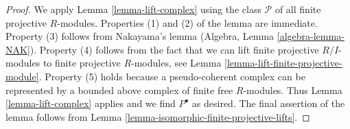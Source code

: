 \documentclass[10pt,a4paper]{amsart}
\theoremstyle{plain}
\theoremstyle{definition}
\theoremstyle{remark}
\numberwithin{equation}{subsection}
\begin{document}
\begin{proof}
We apply Lemma \ref{lemma-lift-complex} using the class $\mathcal{P}$
of all finite projective $R$-modules. Properties (1) and (2)
of the lemma are immediate.
Property (3) follows from Nakayama's lemma
(Algebra, Lemma \ref{algebra-lemma-NAK}).
Property (4) follows from the fact that we can lift finite projective
$R/I$-modules to finite projective $R$-modules, see
Lemma \ref{lemma-lift-finite-projective-module}.
Property (5) holds because a pseudo-coherent complex can be represented
by a bounded above complex of finite free $R$-modules.
Thus Lemma \ref{lemma-lift-complex} applies and we find $P^\bullet$
as desired. The final assertion of the lemma follows from
Lemma \ref{lemma-isomorphic-finite-projective-lifts}.
\end{proof}
\end{document}
